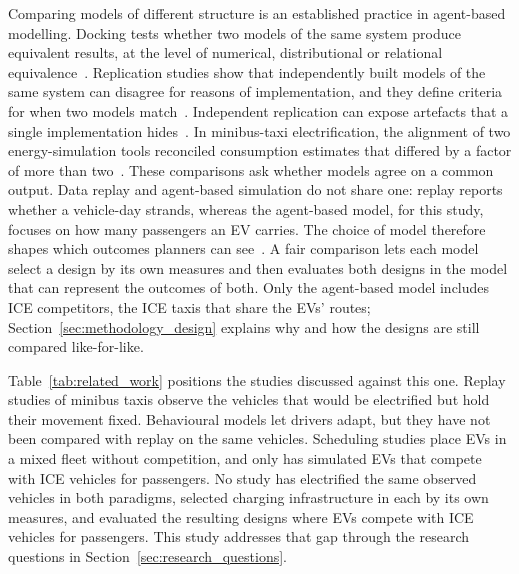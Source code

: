 \documentclass{elsarticle}
\begin{document}
Comparing models of different structure is an established practice in agent-based modelling. Docking tests whether two models of the same system produce equivalent results, at the level of numerical, distributional or relational equivalence~\cite{axtell1996_aligning_simulation_models}. Replication studies show that independently built models of the same system can disagree for reasons of implementation, and they define criteria for when two models match~\cite{edmonds2003_replication_alignment, wilensky2007_making_models_match}. Independent replication can expose artefacts that a single implementation hides~\cite{collins2024_abm_validation_methods}. In minibus-taxi electrification, the alignment of two energy-simulation tools reconciled consumption estimates that differed by a factor of more than two~\cite{abraham2023_aligned_embt_simulation}. These comparisons ask whether models agree on a common output. Data replay and agent-based simulation do not share one: replay reports whether a vehicle-day strands, whereas the agent-based model, for this study, focuses on how many passengers an EV carries. The choice of model therefore shapes which outcomes planners can see~\cite{saltelli2020_models_serve_society, booysen2025_sys_of_sys_em_planning, sello2026_planning_paradigms}. A fair comparison lets each model select a design by its own measures and then evaluates both designs in the model that can represent the outcomes of both. Only the agent-based model includes ICE competitors, the ICE taxis that share the EVs' routes; Section~\ref{sec:methodology_design} explains why and how the designs are still compared like-for-like.


Table~\ref{tab:related_work} positions the studies discussed against this one. Replay studies of minibus taxis observe the vehicles that would be electrified but hold their movement fixed. Behavioural models let drivers adapt, but they have not been compared with replay on the same vehicles. Scheduling studies place EVs in a mixed fleet without competition, and only \citet{sello2025_stellenbosch_embt_abm} has simulated EVs that compete with ICE vehicles for passengers. No study has electrified the same observed vehicles in both paradigms, selected charging infrastructure in each by its own measures, and evaluated the resulting designs where EVs compete with ICE vehicles for passengers. This study addresses that gap through the research questions in Section~\ref{sec:research_questions}.
\end{document}
